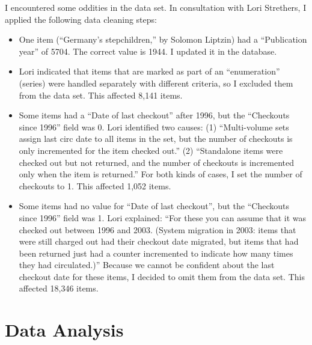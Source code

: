 \documentclass[man,11pt]{apa6}
\begin{document}
I encountered some oddities in the data set.  In consultation with
Lori Strethers, I applied the following data cleaning steps:
\begin{itemize}
\item One item (``Germany's stepchildren,'' by Solomon Liptzin) had a
  ``Publication year'' of 5704.  The correct value is 1944.  I updated it
  in the database.

\item Lori indicated that items that are marked as part of an
  ``enumeration'' (series) were handled separately with different
  criteria, so I excluded them from the data set.  This affected 8,141
  items. 

\item Some items had a ``Date of last checkout'' after 1996, but the
   ``Checkouts since 1996'' field was 0.  Lori identified two causes:
(1) ``Multi-volume sets assign last circ date to all items in the set,
  but the number of checkouts is only incremented for the item checked out.''
(2)  ``Standalone items were checked out but not returned, and the 
  number of checkouts is incremented only when the item is returned.''
For both kinds of cases, I set the number of checkouts to 1.  This
affected 1,052 items.

\item Some items had no value for ``Date of last checkout'', but the
  ``Checkouts since 1996'' field was 1.  Lori explained: ``For these
  you can assume that it was checked out between 1996 and 2003.
  (System migration in 2003: items that were still charged out had
  their checkout date migrated, but items that had been returned just
  had a counter incremented to indicate how many times they had
  circulated.)''
%
Because we cannot be confident about the last checkout date for these
items, I decided to omit them from the data set. This affected 18,346
items. 

\end{itemize}

\section{Data Analysis}
\end{document}
